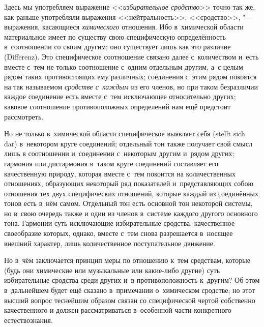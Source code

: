 
Здесь мы употребляем выражение <<{\em избирательное сродство}>> точно так же,
как раньше употребляли выражения <<нейтральность>>, <<сродство>>, "---
выражения, касающиеся {\em химического} отношения. Ибо в~химической области
материальное имеет по существу свою специфическую определённость в~соотношении
со своим другим; оно существует лишь как это различие (Diffe\-renz). Это
специфическое соотношение связано далее с~количеством и~есть вместе с~тем не
только соотношение с~одним отдельным другим, а~с целым рядом таких
противостоящих ему различных; соединения с~этим рядом покоятся на так
называемом {\em сродстве с~каждым} из его членов, но при таком безразличии
каждое соединение есть вместе с~тем исключающее относительно других; каковое
соотношение противоположных определений нам ещё предстоит рассмотреть.

Но не только в~химической области специфическое выявляет себя (stellt sich dar)
в~некотором круге соединений; отдельный тон также получает свой смысл лишь в
соотношении и~соединении с~некоторым другим и~рядом других; гармония или
дисгармония в~таком круге соединений составляет его качественную природу,
которая вместе с~тем покоится на количественных отношениях, образующих
некоторый ряд показателей и~представляющих собою отношения тех двух
специфических отношений, которые каждый из соединённых тонов есть в~нём самом.
Отдельный тон есть основной тон некоторой системы, но в~свою очередь также и
один из членов в~системе каждого другого основного тона. Гармонии суть
исключающие избирательные сродства, качественное своеобразие которых, однако,
вместе с~тем снова разрешается в~носящее внешний характер, лишь количественное
поступательное движение.

Но в~чём заключается принцип меры по отношению к~тем средствам, которые (будь
они химические или музыкальные или какие-либо другие) суть избирательные
сродства среди других и~в противоположность к~другим? Об этом в~дальнейшем
будет ещё сказано в~примечании о~химическом сродстве; но этот высший вопрос
теснейшим образом связан со специфической чертой собственно качественного и
должен рассматриваться в~особенной части конкретного естествознания.

